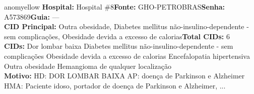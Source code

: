 \documentclass[a4paper,10pt]{article}
\begin{document}
\begin{anomalycard}[Interna\c{c}\~{a}o \#167552 | Pac. \#11740 | MODERADO (z=2.33) | LOS: 6d | 03/03/2026\,$\to$\,09/03/2026]{anomyellow}
\textbf{Hospital:} Hospital \#8\quad \textbf{Fonte:} GHO-PETROBRAS\quad \textbf{Senha:} A573869\quad \textbf{Guia:} ---\\

\textbf{CID Principal:} {\small Outra obesidade, Diabetes mellitus não-insulino-dependente - sem complicações, Obesidade devida a excesso de calorias}\quad\textbf{Total CIDs:} 6\\

\textbf{CIDs:} {\scriptsize Dor lombar baixa \textbar{} Diabetes mellitus não-insulino-dependente - sem complicações \textbar{} Obesidade devida a excesso de calorias \textbar{} Encefalopatia hipertensiva \textbar{} Outra obesidade \textbar{} Hemangioma de qualquer localização}\\

\textbf{Motivo:} {\scriptsize HD: DOR LOMBAR BAIXA  AP:  doença de Parkinson e Alzheimer  HMA: Paciente idoso, portador de doença de Parkinson e Alzheimer, ...}\\




\end{anomalycard}
\end{document}
